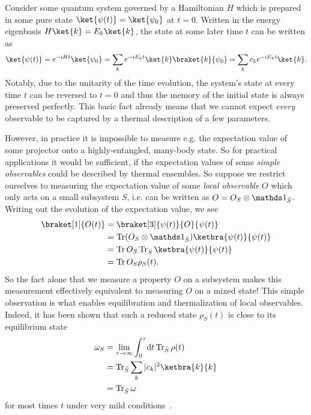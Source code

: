 Consider some quantum system governed by a Hamiltonian $H$ which is prepared in some pure state $\ket{\psi(t)}=\ket{\psi_0}$ at $t=0$. Written in the energy eigenbasis $H\ket{k}=E_k\ket{k}$, the state at some later time $t$ can be written as
\begin{equation}
	\ket{\psi(t)} = e^{-iHt}\ket{\psi_0} = \sum_k e^{-iE_kt}\ket{k}\braket{k}{\psi_0}	= \sum_k c_k e^{-iE_kt}\ket{k}.
\end{equation}
Notably, due to the unitarity of the time evolution, the system's state at every time $t$ can be reversed to $t=0$ and thus the memory of the initial state is always preserved perfectly. This basic fact already means that we cannot expect \emph{every} observable to be captured by a thermal description of a few parameters.

However, in practice it is impossible to measure e.g. the expectation value of some projector onto a highly-entangled, many-body state. So for practical applications it would be sufficient, if the expectation values of some \emph{simple observables} could be described by thermal ensembles. So suppose
we restrict ourselves to measuring the expectation value of some \emph{local observable} $O$ which only acts on a small subsystem $S$, i.e. can be written as $O=O_S\otimes \bbone_{\bar{S}}$. Writing out the evolution of the expectation value, we see
\begin{align}
	\braket[1]{O(t)} &= \braket[3]{\psi(t)}{O}{\psi(t)} \\
	& = \Tr (O_S\otimes\bbone_{\bar{S}})\ketbra{\psi(t)}{\psi(t)}\\
	& = \Tr O_S \Tr_{\bar S} \ketbra{\psi(t)}{\psi(t)}\\
	&= \Tr O_S \rho_S(t).
\end{align}
So the fact alone that we measure a property $O$ on a subsystem makes this measurement effectively equivalent to measuring $O$ on a mixed state! This simple observation is what enables equilibration and thermalization of local observables. Indeed, it has been shown that such a reduced state $\rho_S(t)$ is close to its equilibrium state
\begin{align}
	\omega_S &= \lim_{\tau\rightarrow\infty}\int_{0}^{\tau}\!\mathrm{d}t \Tr_{\bar S}\rho(t)\\
	&= \Tr_{\bar S} \sum_k |c_k|^2 \ketbra{k}{k}\\
	&= \Tr_{\bar S} \omega
\end{align}\label{eq:diagonal-ensemble}
for most times $t$ under very mild conditions~\cite{reimannFoundationStatisticalMechanics2008,lindenQuantumMechanicalEvolution2009}. 

